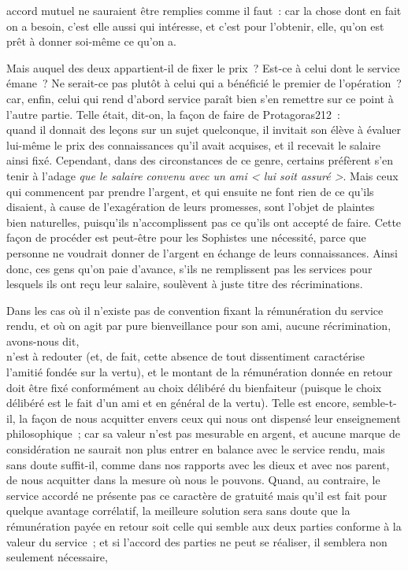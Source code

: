 \documentclass[french,twoside]{book} %
\begin{document}
accord mutuel ne sauraient être remplies comme il faut : car la chose dont en fait on a besoin, c’est elle aussi qui intéresse, et c’est pour l’obtenir, elle, qu’on est prêt à donner soi-même ce qu’on a.\par
Mais auquel des deux appartient-il de fixer le prix ? Est-ce à celui dont le service émane ? Ne serait-ce pas plutôt à celui qui a bénéficié le premier de l’opération ? car, enfin, celui qui rend d’abord service paraît bien s’en remettre sur ce point à l’autre partie. Telle était, dit-on, la façon de faire de Protagoras212 : \\
quand il donnait des leçons sur un sujet quelconque, il invitait son élève à évaluer lui-même le prix des connaissances qu’il avait acquises, et il recevait le salaire ainsi fixé. Cependant, dans des circonstances de ce genre, certains préfèrent s’en tenir à l’adage {\itshape que le salaire convenu avec un ami < lui soit assuré >}. Mais ceux qui commencent par prendre l’argent, et qui ensuite ne font rien de ce qu’ils disaient, à cause de l’exagération de leurs promesses, sont l’objet de plaintes \\
bien naturelles, puisqu’ils n’accomplissent pas ce qu’ils ont accepté de faire. Cette façon de procéder est peut-être pour les Sophistes une nécessité, parce que personne ne voudrait donner de l’argent en échange de leurs connaissances. Ainsi donc, ces gens qu’on paie d’avance, s’ils ne remplissent pas les services pour lesquels ils ont reçu leur salaire, soulèvent à juste titre des récriminations.\par
Dans les cas où il n’existe pas de convention fixant la rémunération du service rendu, et où on agit par pure bienveillance pour son ami, aucune récrimination, avons-nous dit, \\
n’est à redouter (et, de fait, cette absence de tout dissentiment caractérise l’amitié fondée sur la vertu), et le montant de la  rémunération donnée en retour doit être fixé conformément au choix délibéré du bienfaiteur (puisque le choix délibéré est le fait d’un ami et en général de la vertu). Telle est encore, semble-t-il, la façon de nous acquitter envers ceux qui nous ont dispensé leur enseignement philosophique ; car sa valeur n’est pas mesurable en argent, et aucune marque de considération ne saurait non plus entrer en balance avec le service rendu, mais \\
sans doute suffit-il, comme dans nos rapports avec les dieux et avec nos parent, de nous acquitter dans la mesure où nous le pouvons. Quand, au contraire, le service accordé ne présente pas ce caractère de gratuité mais qu’il est fait pour quelque avantage corrélatif, la meilleure solution sera sans doute que la rémunération payée en retour soit celle qui semble aux deux parties conforme à la valeur du service ; et si l’accord des parties ne peut se réaliser, il semblera non seulement nécessaire, \\
\end{document}
